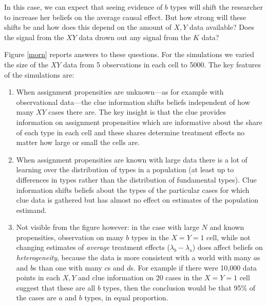 \documentclass[12pt,]{book}
\newenvironment{Shaded}{\begin{snugshade}}{\end{snugshade}}
\newcommand{\FloatTok}[1]{\textcolor[rgb]{0.00,0.00,0.81}{#1}}
\newcommand{\KeywordTok}[1]{\textcolor[rgb]{0.13,0.29,0.53}{\textbf{#1}}}
\newcommand{\NormalTok}[1]{#1}
\newcommand{\OperatorTok}[1]{\textcolor[rgb]{0.81,0.36,0.00}{\textbf{#1}}}
\newcommand{\StringTok}[1]{\textcolor[rgb]{0.31,0.60,0.02}{#1}}
\begin{document}
In this case, we can expect that seeing evidence of \(b\) types will shift the researcher to increase her beliefs on the average causal effect. But how strong will these shifts be and how does this depend on the amount of \(X, Y\) data available? Does the signal from the \(XY\) data drown out any signal from the \(K\) data?

Figure \ref{morn} reports answers to these questions. For the simulations we varied the size of the \(XY\) data from 5 observations in each cell to 5000. The key features of the simulations are:

\begin{enumerate}
\def\labelenumi{\arabic{enumi}.}
\item
  When assignment propensities are unknown---as for example with observational data---the clue information shifts beliefs independent of how many \(XY\) cases there are. The key insight is that the clue provides information on assignment propensities which are informative about the share of each type in each cell and these shares determine treatment effects no matter how large or small the cells are.
\item
  When assignment propensities are known with large data there is a lot of learning over the distribution of types in a population (at least up to differences in types rather than the distribution of fundamental types). Clue information shifts beliefs about the types of the particular cases for which clue data is gathered but has almost no effect on estimates of the population estimand.
\item
  Not visible from the figure however: in the case with large \(N\) and known propensities, observation on many \(b\) types in the \(X=Y=1\) cell, while not changing estimates of \emph{average} treatment effects (\(\lambda_b- \lambda_s\)) does affect beliefs on \emph{heterogeneity}, because the data is more consistent with a world with many \(a\)s and \(b\)s than one with many \(c\)s and \(d\)s. For example if there were 10,000 data points in each \(X,Y\) and clue information on 20 cases in the \(X=Y=1\) cell suggest that these are all \(b\) types, then the conclusion would be that 95\% of the cases are \(a\) and \(b\) types, in equal proportion.
\end{enumerate}

\begin{Shaded}
\end{Shaded}
\end{document}
